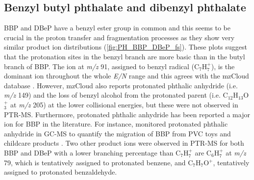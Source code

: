 \subsection{Benzyl butyl phthalate
and dibenzyl phthalate}

BBP and DBeP have a benzyl ester group in common and this seems to be crucial in the proton transfer and fragmentation processes as they show very similar product ion distributions (\autoref{fig:PH_BBP_DBeP_fs}). 
These plots suggest that the protonation sites in the benzyl branch are more basic than in the butyl branch  of BBP.
%
The ion at \textit{m/z} 91, assigned to benzyl radical (C$_7$H$_7^+$), is the dominant ion throughout the whole \textit{E/N} range and this agrees with the mzCloud database \cite{mzcloudBBP}.
%
However, mzCloud also reports protonated phthalic anhydride (i.e. \textit{m/z} 149) and the loss of benzyl alcohol from the protonated parent (i.e. C$_{12}$H$_{13}$O$_3^+$ at \textit{m/z} 205) at the lower collisional energies, but these were not observed in PTR-MS. %
%
Furthermore, protonated phthalic anhydride has been reported a major ion for BBP in the literature. For instance, \citeauthor{earls2003gas} monitored protonated phthalic anhydride  in GC-MS to quantify the migration of BBP from PVC toys and childcare products \cite{earls2003gas}.
%
Two other product ions were observed in PTR-MS for both BBP and DBeP with a lower branching percentage than C$_7$H$_7^+$ are
C$_6$H$_7^+$ at \textit{m/z} 79, which is tentatively assigned to protonated benzene, 
and C$_7$H$_7$O$^+$, tentatively assigned to protonated benzaldehyde.

